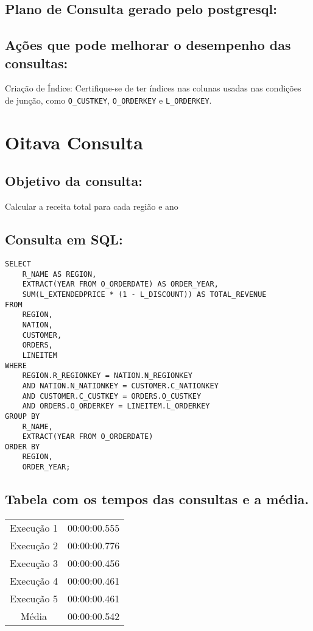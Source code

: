 \documentclass[12pt]{article}
\begin{document}
\begin{landscape}
\subsection{Plano de Consulta gerado pelo postgresql:}

\subsection{Ações que pode melhorar o desempenho das 
consultas:} Criação de Índice: Certifique-se de ter índices nas colunas usadas nas condições de junção, como \texttt{O\_CUSTKEY}, \texttt{O\_ORDERKEY} e \texttt{L\_ORDERKEY}.
\section{Oitava Consulta}


\subsection{Objetivo da consulta:}
Calcular a receita total para cada região e ano

\subsection{Consulta em SQL:}
\begin{lstlisting}
SELECT
    R_NAME AS REGION,
    EXTRACT(YEAR FROM O_ORDERDATE) AS ORDER_YEAR,
    SUM(L_EXTENDEDPRICE * (1 - L_DISCOUNT)) AS TOTAL_REVENUE
FROM
    REGION,
    NATION,
    CUSTOMER,
    ORDERS,
    LINEITEM
WHERE
    REGION.R_REGIONKEY = NATION.N_REGIONKEY
    AND NATION.N_NATIONKEY = CUSTOMER.C_NATIONKEY
    AND CUSTOMER.C_CUSTKEY = ORDERS.O_CUSTKEY
    AND ORDERS.O_ORDERKEY = LINEITEM.L_ORDERKEY
GROUP BY
    R_NAME,
    EXTRACT(YEAR FROM O_ORDERDATE)
ORDER BY
    REGION,
    ORDER_YEAR;
\end{lstlisting}

\subsection{Tabela com os tempos das consultas e a média.}
\begin{tabular}{|c|c|}
  \hline
  Execução 1 & 00:00:00.555 \\
  Execução 2 & 00:00:00.776 \\
  Execução 3 & 00:00:00.456 \\
  Execução 4 & 00:00:00.461 \\
  Execução 5 & 00:00:00.461 \\
  \hline
  Média & 00:00:00.542 \\
  \hline
\end{tabular}


\end{landscape}
\end{document}
